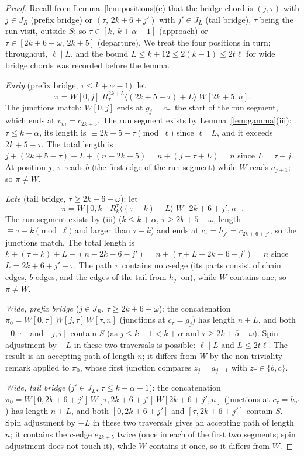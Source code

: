 \documentclass[11pt]{article}
\theoremstyle{definition}
\begin{document}
\begin{proof}
Recall from Lemma~\ref{lem:positions}(e) that the bridge chord is
$(j,\tau)$ with $j\in J_R$ (prefix bridge) or $(\tau,\,2k+6+j')$ with
$j'\in J_L$ (tail bridge), $\tau$ being the run visit, outside $S$; so
$\tau\in[k,\,k+\alpha-1]$ (approach) or $\tau\in[2k+6-\omega,\,2k+5]$
(departure). We treat the four positions in turn; throughout, $\ell\mid L$,
and the bound $L\le k+12\le 2(k-1)\le 2t\ell$ for wide bridge chords was
recorded before the lemma.

\emph{Early} (prefix bridge, $\tau\le k+\alpha-1$): let
\[
\pi=W[0,j]\;R_\tau^{2k+5}\bigl\langle (2k+5-\tau)+L\bigr\rangle\;W[2k+5,n].
\]
The junctions match: $W[0,j]$ ends at $g_j=c_\tau$, the start of the run
segment, which ends at $v_m=c_{2k+5}$. The run segment exists by
Lemma~\ref{lem:gamma}(iii): $\tau\le k+\alpha$, its length is
$\equiv 2k+5-\tau\pmod\ell$ since $\ell\mid L$, and it exceeds $2k+5-\tau$.
The total length is $j+(2k+5-\tau)+L+(n-2k-5)=n+(j-\tau+L)=n$ since
$L=\tau-j$. At position $j$, $\pi$ reads $b$ (the first edge of the run
segment) while $W$ reads $a_{j+1}$; so $\pi\ne W$.

\emph{Late} (tail bridge, $\tau\ge2k+6-\omega$): let
\[
\pi=W[0,k]\;R_k^{\tau}\bigl\langle(\tau-k)+L\bigr\rangle\;W[2k+6+j',n].
\]
The run segment exists by (iii) ($k\le k+\alpha$, $\tau\ge2k+5-\omega$,
length $\equiv\tau-k\pmod\ell$ and larger than $\tau-k$) and ends at
$c_\tau=h_{j'}=c_{2k+6+j'}$, so the junctions match. The total length is
$k+(\tau-k)+L+(n-2k-6-j')=n+(\tau+L-2k-6-j')=n$ since $L=2k+6+j'-\tau$.
The path $\pi$ contains no $c$-edge (its parts consist of chain edges,
$b$-edges, and the edges of the tail from $h_{j'}$ on), while $W$ contains
one; so $\pi\ne W$.

\emph{Wide, prefix bridge} ($j\in J_R$, $\tau\ge2k+6-\omega$): the
concatenation $\pi_0=W[0,\tau]\,W[j,\tau]\,W[\tau,n]$ (junctions at
$c_\tau=g_j$) has length $n+L$, and both $[0,\tau]$ and $[j,\tau]$ contain
$S$ (as $j\le k-1<k+\alpha$ and $\tau\ge 2k+5-\omega$). Spin adjustment by
$-L$ in these two traversals is possible: $\ell\mid L$ and
$L\le2t\ell$. The result is an accepting path of length $n$; it differs
from $W$ by the non-triviality remark applied to $\pi_0$, whose first
junction compares $z_j=a_{j+1}$ with $z_\tau\in\{b,c\}$.

\emph{Wide, tail bridge} ($j'\in J_L$, $\tau\le k+\alpha-1$): the
concatenation $\pi_0=W[0,2k+6+j']\,W[\tau,2k+6+j']\,W[2k+6+j',n]$
(junctions at $c_\tau=h_{j'}$) has length $n+L$, and both $[0,2k+6+j']$ and
$[\tau,2k+6+j']$ contain $S$. Spin adjustment by $-L$ in these two
traversals gives an accepting path of length $n$; it contains the $c$-edge
$e_{2k+5}$ twice (once in each of the first two segments; spin adjustment
does not touch it), while $W$ contains it once, so it differs from $W$.
\end{proof}
\end{document}
